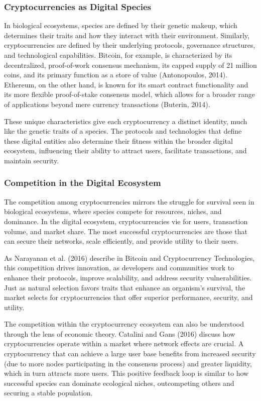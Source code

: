 \documentclass[12pt,twoside]{article}
\begin{document}
\subsubsection{Cryptocurrencies as Digital Species}

In biological ecosystems, species are defined by their genetic makeup, which determines their traits and how they interact with their environment. Similarly, cryptocurrencies are defined by their underlying protocols, governance structures, and technological capabilities. Bitcoin, for example, is characterized by its decentralized, proof-of-work consensus mechanism, its capped supply of 21 million coins, and its primary function as a store of value (Antonopoulos, 2014). Ethereum, on the other hand, is known for its smart contract functionality and its more flexible proof-of-stake consensus model, which allows for a broader range of applications beyond mere currency transactions (Buterin, 2014).

These unique characteristics give each cryptocurrency a distinct identity, much like the genetic traits of a species. The protocols and technologies that define these digital entities also determine their fitness within the broader digital ecosystem, influencing their ability to attract users, facilitate transactions, and maintain security.

\subsubsection{Competition in the Digital Ecosystem}

The competition among cryptocurrencies mirrors the struggle for survival seen in biological ecosystems, where species compete for resources, niches, and dominance. In the digital ecosystem, cryptocurrencies vie for users, transaction volume, and market share. The most successful cryptocurrencies are those that can secure their networks, scale efficiently, and provide utility to their users.

As Narayanan et al. (2016) describe in Bitcoin and Cryptocurrency Technologies, this competition drives innovation, as developers and communities work to enhance their protocols, improve scalability, and address security vulnerabilities. Just as natural selection favors traits that enhance an organism's survival, the market selects for cryptocurrencies that offer superior performance, security, and utility.

The competition within the cryptocurrency ecosystem can also be understood through the lens of economic theory. Catalini and Gans (2016) discuss how cryptocurrencies operate within a market where network effects are crucial. A cryptocurrency that can achieve a large user base benefits from increased security (due to more nodes participating in the consensus process) and greater liquidity, which in turn attracts more users. This positive feedback loop is similar to how successful species can dominate ecological niches, outcompeting others and securing a stable population.
\end{document}
